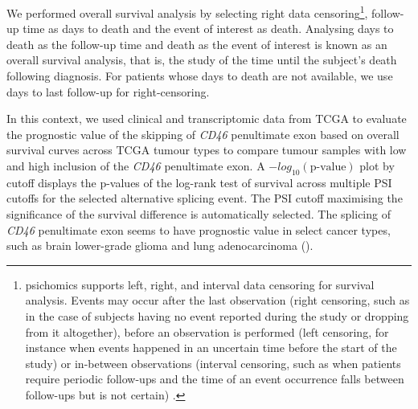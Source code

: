 We performed overall survival analysis by selecting right data censoring\footnote{psichomics supports left, right, and interval data censoring for survival analysis. Events may occur after the last observation (right censoring, such as in the case of subjects having no event reported during the study or dropping from it altogether), before an observation is performed (left censoring, for instance when events happened in an uncertain time before the start of the study) or in-between observations (interval censoring, such as when patients require periodic follow-ups and the time of an event occurrence falls between follow-ups but is not certain) \cite{zhang:2010wk}.}, follow-up time as days to death and the event of interest as death. Analysing days to death as the follow-up time and death as the event of interest is known as an overall survival analysis, that is, the study of the time until the subject’s death following diagnosis. For patients whose days to death are not available, we use days to last follow-up for right-censoring. %
 
In this context, we used clinical and transcriptomic data from TCGA to evaluate the prognostic value of the skipping of \emph{CD46} penultimate exon based on overall survival curves across TCGA tumour types to compare tumour samples with low and high inclusion of the \emph{CD46} penultimate exon. A $-log_{10}(\textrm{p-value})$ plot by cutoff displays the p-values of the log-rank test of survival across multiple PSI cutoffs for the selected alternative splicing event. The PSI cutoff maximising the significance of the survival difference is automatically selected. The splicing of \emph{CD46} penultimate exon seems to have prognostic value in select cancer types, such as brain lower-grade glioma and lung adenocarcinoma ().


